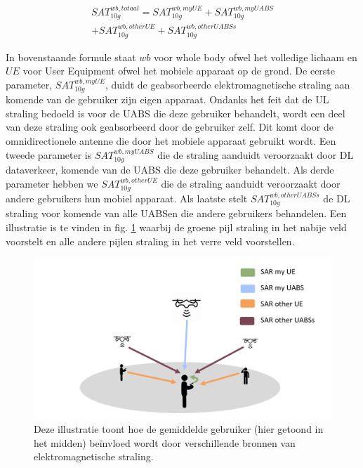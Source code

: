 \documentclass[twocolumn]{phdsymp_dutch}
\begin{document}
\begin{equation} 
\begin{aligned}
SAT^{wb,totaal}_{10g} = SAT^{wb,myUE}_{10g} +  SAT^{wb,myUABS}_{10g} \\
+ SAT^{wb,otherUE}_{10g} + SAT^{wb,otherUABSs}_{10g}
\end{aligned}
\label{eq:overallSARwb}
\end{equation}

In bovenstaande formule staat $wb$ voor whole body ofwel het volledige lichaam en $UE$ voor User Equipment ofwel het mobiele apparaat op de grond.
De eerste parameter, $SAT^{wb,myUE}_{10g}$, duidt de geabsorbeerde elektromagnetische straling aan komende van de gebruiker zijn eigen apparaat.
Ondanks het feit dat de \gls{UL} straling bedoeld is voor de \gls{UABS} die deze gebruiker behandelt,
wordt een deel van deze straling ook geabsorbeerd door de gebruiker zelf.
Dit komt door de omnidirectionele antenne die door het mobiele apparaat gebruikt wordt.
Een tweede parameter is $SAT^{wb,myUABS}_{10g}$ die de straling aanduidt veroorzaakt door \gls{DL} dataverkeer, komende van de \gls{UABS} die deze gebruiker behandelt.
Als derde parameter hebben we $SAT^{wb,otherUE}_{10g}$ die de straling aanduidt veroorzaakt door andere gebruikers hun mobiel apparaat.
Als laatste stelt $SAT^{wb,otherUABSs}_{10g}$ de \gls{DL} straling voor komende van alle \gls{UABS}en die andere gebruikers behandelen.
Een illustratie is te vinden in fig. \ref{fig:netwerkIllustration} waarbij de groene pijl straling in het nabije veld voorstelt en alle andere 
pijlen straling in het verre veld voorstellen.

\begin{figure}[h!]
\centering
  \includegraphics[width=\linewidth]{networkIllustrationSARSources.png}
  \caption{Deze illustratie toont hoe de gemiddelde gebruiker (hier getoond in het midden) be\"invloed wordt door verschillende bronnen van elektromagnetische straling.}
  \label{fig:netwerkIllustration}
\end{figure}
\end{document}
